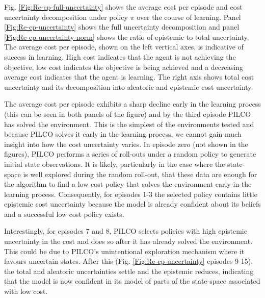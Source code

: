 Fig. \ref{Fig:Re-cp-full-uncertainty} shows the average cost per episode and cost uncertainty decomposition under policy $\pi$ over the course of learning. Panel \ref{Fig:Re-cp-uncertainty} shows the full uncertainty decomposition and panel \ref{Fig:Re-cp-uncertainty-norm} shows the ratio of epistemic to total uncertainty. The average cost per episode, shown on the left vertical axes, is indicative of success in learning. High cost indicates that the agent is not achieving the objective, low cost indicates the objective is being achieved and a decreasing average cost indicates that the agent is learning. The right axis shows total cost uncertainty and its decomposition into aleatoric and epistemic cost uncertainty. 

The average cost per episode exhibits a sharp decline early in the learning process (this can be seen in both panels of the figure) and by the third episode PILCO has solved the environment. This is the simplest of the environments tested and because PILCO solves it early in the learning process, we cannot gain much insight into how the cost uncertainty varies. In episode zero (not shown in the figures), PILCO performs a series of roll-outs under a random policy to generate initial state observations. It is likely, particularly in the case where the state-space is well explored during the random roll-out, that these data are enough for the algorithm to find a low cost policy that solves the environment early in the learning process. Consequently, for episodes 1-3 the selected policy contains little epistemic cost uncertainty because the model is already confident about its beliefs and a successful low cost policy exists. 

Interestingly, for episodes 7 and 8, PILCO selects policies with high epistemic uncertainty in the cost and does so after it has already solved the environment. This could be due to PILCO's unintentional exploration mechanism where it favours uncertain states. After this (Fig. \ref{Fig:Re-cp-uncertainty} episodes 9-15), the total and aleatoric uncertainties settle and the epistemic reduces, indicating that the model is now confident in its model of parts of the state-space associated with low cost.


